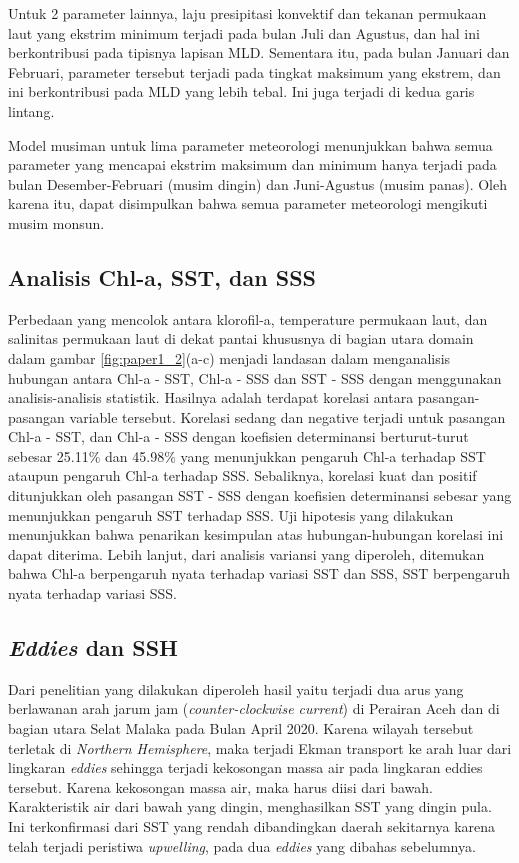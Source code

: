 \begin{spacing}{1.5}
	Untuk 2 parameter lainnya, laju presipitasi konvektif dan tekanan permukaan laut yang ekstrim minimum terjadi pada bulan Juli dan Agustus, dan hal ini berkontribusi pada tipisnya lapisan MLD. Sementara itu, pada bulan Januari dan Februari, parameter tersebut terjadi pada tingkat maksimum yang ekstrem, dan ini berkontribusi pada MLD yang lebih tebal. Ini juga terjadi di kedua garis lintang.
	
	Model musiman untuk lima parameter meteorologi menunjukkan bahwa semua parameter yang mencapai ekstrim maksimum dan minimum hanya terjadi pada bulan Desember-Februari (musim dingin) dan Juni-Agustus (musim panas). Oleh karena itu, dapat disimpulkan bahwa semua parameter meteorologi mengikuti musim monsun.
	
\subsection[Analisis Chl-a, SST, dan SSS]{Analisis Chl-a, SST, dan SSS}
	Perbedaan yang mencolok antara klorofil-a, temperature permukaan laut, dan salinitas permukaan laut di dekat pantai khususnya di bagian utara domain dalam gambar \ref{fig:paper1_2}(a-c) menjadi landasan dalam menganalisis hubungan antara Chl-a - SST, Chl-a - SSS dan SST - SSS dengan menggunakan analisis-analisis statistik. Hasilnya adalah terdapat korelasi antara pasangan-pasangan variable tersebut. Korelasi sedang dan negative terjadi untuk pasangan Chl-a - SST, dan Chl-a - SSS dengan koefisien determinansi berturut-turut sebesar 25.11\% dan 45.98\% yang menunjukkan pengaruh Chl-a terhadap SST ataupun pengaruh Chl-a terhadap SSS. Sebaliknya, korelasi kuat dan positif ditunjukkan oleh pasangan SST - SSS dengan koefisien determinansi sebesar yang menunjukkan pengaruh SST terhadap SSS. Uji hipotesis yang dilakukan menunjukkan bahwa penarikan kesimpulan atas hubungan-hubungan korelasi ini dapat diterima. Lebih lanjut, dari analisis variansi yang diperoleh, ditemukan bahwa Chl-a berpengaruh nyata terhadap variasi SST dan SSS, SST berpengaruh nyata terhadap variasi SSS.
	
\subsection[\textit{Eddies} dan SSH]{\textit{Eddies} dan SSH}

	Dari penelitian yang dilakukan diperoleh hasil yaitu terjadi dua arus yang berlawanan arah jarum jam (\textit{counter-clockwise current}) di Perairan Aceh dan di bagian utara Selat Malaka pada Bulan April 2020. Karena wilayah tersebut terletak di \textit{Northern Hemisphere}, maka terjadi Ekman transport ke arah luar dari lingkaran \textit{eddies} sehingga terjadi kekosongan massa air pada lingkaran eddies tersebut. Karena kekosongan massa air, maka harus diisi dari bawah. Karakteristik air dari bawah yang dingin, menghasilkan SST yang dingin pula. Ini terkonfirmasi dari SST yang rendah dibandingkan daerah sekitarnya karena telah terjadi peristiwa \textit{upwelling}, pada dua \textit{eddies} yang dibahas sebelumnya.
	

\end{spacing}
